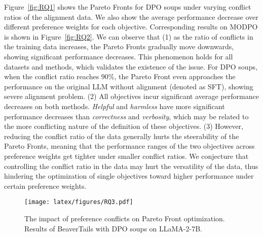 Figure~\ref{fig:RQ1} shows the Pareto Fronts for DPO soups under varying conflict ratios of the alignment data. We also show the average performance decrease over different preference weights for each objective. 
Corresponding results on MODPO is shown in Figure~\ref{fig:RQ2}. 
We can observe that 
(1) as the ratio of conflicts in the training data increases, the Pareto Fronts gradually move downwards, showing significant performance decreases. 
This phenomenon holds for all datasets and methods, which validates the existence of the issue. 
For DPO soups, when the conflict ratio reaches 90\%, the Pareto Front even approaches the performance on the original LLM without alignment (denoted as SFT), showing severe alignment problem. 
(2) All objectives incur significant average performance decreases on both methods. \textit{Helpful} and \textit{harmless} have more significant performance decreases than \textit{correctness} and \textit{verbosity}, which may be related to the more conflicting nature of the definition of these objectives. 
(3) However, reducing the conflict ratio of the data generally hurts the steerability of the Pareto Fronts, meaning that the performance ranges of the two objectives across preference weights get tighter under smaller conflict ratios. We conjecture that controlling the conflict ratio in the data may hurt the versatility of the data, thus hindering the optimization of single objectives toward higher performance under certain preference weights. 


\begin{figure}[t]
 \setlength{\abovecaptionskip}{0.05cm}
 \setlength{\belowcaptionskip}{0cm}
    \centering
    \texttt{[image: latex/figures/RQ3.pdf]}
    \caption{The impact of preference conflicts on Pareto Front optimization. Results of BeaverTails with DPO soups on LLaMA-2-7B. }
    \label{fig:RQ3}
\end{figure}


\begin{table}[t]
\centering
\setlength{\abovecaptionskip}{0.05cm}
\setlength{\belowcaptionskip}{0cm}
\setlength{\tabcolsep}{2pt}
\caption{Statistics on the conflict ratio in Helpsteer and BeaverTails datasets.}
\label{tab:conflict_ratio}
\end{table}


